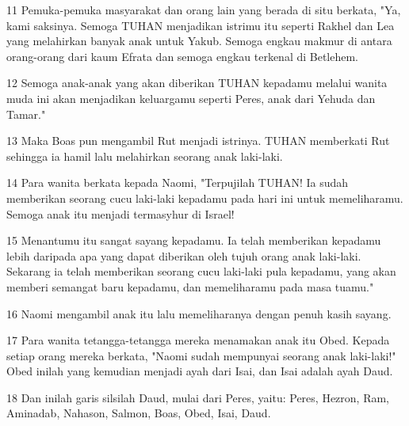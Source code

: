 \par 11 Pemuka-pemuka masyarakat dan orang lain yang berada di situ berkata, "Ya, kami saksinya. Semoga TUHAN menjadikan istrimu itu seperti Rakhel dan Lea yang melahirkan banyak anak untuk Yakub. Semoga engkau makmur di antara orang-orang dari kaum Efrata dan semoga engkau terkenal di Betlehem.
\par 12 Semoga anak-anak yang akan diberikan TUHAN kepadamu melalui wanita muda ini akan menjadikan keluargamu seperti Peres, anak dari Yehuda dan Tamar."
\par 13 Maka Boas pun mengambil Rut menjadi istrinya. TUHAN memberkati Rut sehingga ia hamil lalu melahirkan seorang anak laki-laki.
\par 14 Para wanita berkata kepada Naomi, "Terpujilah TUHAN! Ia sudah memberikan seorang cucu laki-laki kepadamu pada hari ini untuk memeliharamu. Semoga anak itu menjadi termasyhur di Israel!
\par 15 Menantumu itu sangat sayang kepadamu. Ia telah memberikan kepadamu lebih daripada apa yang dapat diberikan oleh tujuh orang anak laki-laki. Sekarang ia telah memberikan seorang cucu laki-laki pula kepadamu, yang akan memberi semangat baru kepadamu, dan memeliharamu pada masa tuamu."
\par 16 Naomi mengambil anak itu lalu memeliharanya dengan penuh kasih sayang.
\par 17 Para wanita tetangga-tetangga mereka menamakan anak itu Obed. Kepada setiap orang mereka berkata, "Naomi sudah mempunyai seorang anak laki-laki!" Obed inilah yang kemudian menjadi ayah dari Isai, dan Isai adalah ayah Daud.
\par 18 Dan inilah garis silsilah Daud, mulai dari Peres, yaitu: Peres, Hezron, Ram, Aminadab, Nahason, Salmon, Boas, Obed, Isai, Daud.


